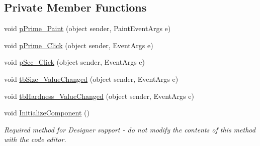\subsection*{Private Member Functions}
\begin{DoxyCompactItemize}
\item 
void \mbox{\hyperlink{class_paint___program_1_1_brush_settings_a6b5c3a5900da47314538884ab4105b68}{p\+Prime\+\_\+\+Paint}} (object sender, Paint\+Event\+Args e)
\item 
void \mbox{\hyperlink{class_paint___program_1_1_brush_settings_afe09accaa86f4448f40ddba23ba97abe}{p\+Prime\+\_\+\+Click}} (object sender, Event\+Args e)
\item 
void \mbox{\hyperlink{class_paint___program_1_1_brush_settings_a3d006a8ba7eda56d0d50ce035216c34d}{p\+Sec\+\_\+\+Click}} (object sender, Event\+Args e)
\item 
void \mbox{\hyperlink{class_paint___program_1_1_brush_settings_aa21e17cb46e250b5fb82b1e675dfe768}{tb\+Size\+\_\+\+Value\+Changed}} (object sender, Event\+Args e)
\item 
void \mbox{\hyperlink{class_paint___program_1_1_brush_settings_ac22200ba660ed7ef86423947efb74005}{tb\+Hardness\+\_\+\+Value\+Changed}} (object sender, Event\+Args e)
\item 
void \mbox{\hyperlink{class_paint___program_1_1_brush_settings_a9d332d1302bbf06495360c3a281bd49b}{Initialize\+Component}} ()
\begin{DoxyCompactList}\small\item\em Required method for Designer support -\/ do not modify the contents of this method with the code editor. \end{DoxyCompactList}\end{DoxyCompactItemize}
